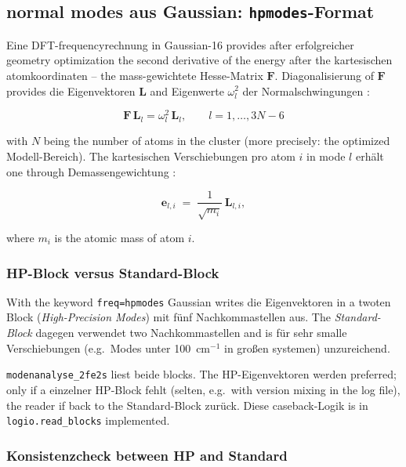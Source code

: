 \documentclass[11pt,a4paper,twoside]{article}
\newcommand{\evec}{\mathbf{e}}
\theoremstyle{remark}
\begin{document}
\subsection{normal modes aus Gaussian: \texttt{hpmodes}-Format}
\label{sec:normalmoden}

Eine DFT-frequencyrechnung in Gaussian-16 provides after erfolgreicher
geometry optimization the second derivative of the energy after the
kartesischen atomkoordinaten -- the mass-gewichtete Hesse-Matrix
$\mathbf{F}$. Diagonalisierung of $\mathbf{F}$ provides die
Eigenvektoren $\mathbf{L}$ and Eigenwerte $\omega_l^2$ der
Normalschwingungen \cite{WilsonDeciusCross1955}:

\begin{equation}
  \mathbf{F}\,\mathbf{L}_l = \omega_l^2 \, \mathbf{L}_l ,
  \qquad l = 1, \ldots, 3N-6
  \label{eq:fg-eigenproblem}
\end{equation}

with $N$ being the number of atoms in the cluster (more precisely: the optimized
Modell-Bereich). The kartesischen Verschiebungen pro atom $i$ in
mode $l$ erh\"alt one through Demassengewichtung
\cite{WilsonDeciusCross1955}:

\begin{equation}
  \evec_{l,i} \;=\; \frac{1}{\sqrt{m_i}}\,\mathbf{L}_{l,i} ,
  \label{eq:demass}
\end{equation}

where $m_i$ is the atomic mass of atom $i$.

\subsubsection*{HP-Block versus Standard-Block}

With the keyword \texttt{freq=hpmodes} Gaussian writes die
Eigenvektoren in a twoten Block (\emph{High-Precision Modes}) mit
f\"unf Nachkommastellen aus. The \emph{Standard-Block} dagegen
verwendet two Nachkommastellen and is f\"ur sehr smalle
Verschiebungen (e.g.\ Modes unter 100~cm$^{-1}$ in gro\ss en
systemen) unzureichend.

\texttt{modenanalyse\_2fe2s} liest beide blocks. The HP-Eigenvektoren
werden preferred; only if a einzelner HP-Block fehlt (selten, e.g.\
with version mixing in the log file), the reader if back to the
Standard-Block zur\"uck. Diese caseback-Logik is in
\texttt{logio.read\_blocks} implemented.

\subsubsection*{Konsistenzcheck between HP and Standard}
\label{sec:hp-std-check}
\end{document}
